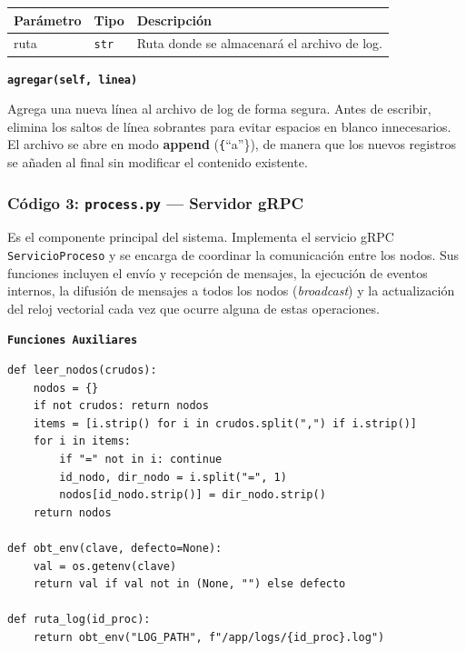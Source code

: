 \documentclass[letterpaper,11pt]{article}
\begin{document}
\begin{center}
\begin{tabular}{>{\ttfamily}l l p{7cm}}
\toprule
\textbf{Parámetro} & \textbf{Tipo} & \textbf{Descripción} \\
\midrule
ruta & \texttt{str} & Ruta donde se almacenará el archivo de log. \\
\bottomrule
\end{tabular}
\end{center}

\textbf{\texttt{agregar(self, linea)}}

Agrega una nueva línea al archivo de log de forma segura. Antes de
escribir, elimina los saltos de línea sobrantes para evitar espacios en
blanco innecesarios. El archivo se abre en modo \textbf{append}
(\texttt\{``a''\}), de manera que los nuevos registros se añaden al final sin
modificar el contenido existente.

\subsubsection{Código 3: \texttt{process.py} — Servidor gRPC}

Es el componente principal del sistema. Implementa el servicio gRPC
\texttt{ServicioProceso} y se encarga de coordinar la comunicación entre
los nodos. Sus funciones incluyen el envío y recepción de mensajes, la
ejecución de eventos internos, la difusión de mensajes a todos los nodos
(\textit{broadcast}) y la actualización del reloj vectorial cada vez que
ocurre alguna de estas operaciones.


\textbf{\texttt{\texttt{Funciones Auxiliares}}}

\begin{lstlisting}[style=python, caption={process.py — Funciones auxiliares }]
def leer_nodos(crudos):
    nodos = {}
    if not crudos: return nodos
    items = [i.strip() for i in crudos.split(",") if i.strip()]
    for i in items:
        if "=" not in i: continue
        id_nodo, dir_nodo = i.split("=", 1)
        nodos[id_nodo.strip()] = dir_nodo.strip()
    return nodos
 
def obt_env(clave, defecto=None):
    val = os.getenv(clave)
    return val if val not in (None, "") else defecto
 
def ruta_log(id_proc):
    return obt_env("LOG_PATH", f"/app/logs/{id_proc}.log")
\end{lstlisting}
 
\end{document}
